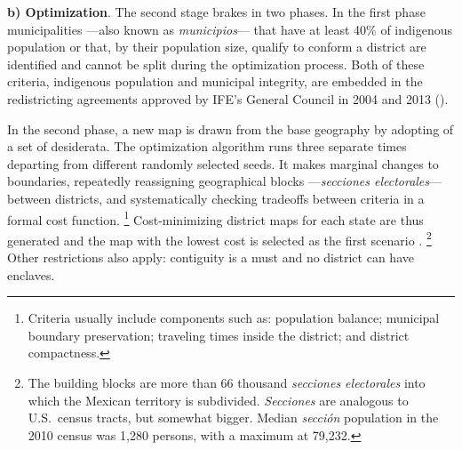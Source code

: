 \documentclass[letter,12pt]{article}
\begin{document}
\textbf{b) Optimization}. The second stage brakes in two phases. In the first phase municipalities ---also known as \emph{municipios}---  that have at least 40\% of indigenous population or that, by their population size, qualify to conform a district are identified and cannot be split during the optimization process. Both of these criteria, indigenous population and municipal integrity, are embedded in the redistricting agreements approved by IFE's General Council in 2004 and 2013 (\citep{acuerdo.ife.2004,acuerdo.ife.2013}). 


In the second phase, a new map is drawn from the base geography by adopting of a set of desiderata. The optimization algorithm runs three separate times departing from different randomly selected seeds. It makes marginal changes to boundaries, repeatedly reassigning geographical blocks ---\emph{secciones electorales}--- between districts, and systematically checking tradeoffs between criteria in a formal cost function. \footnote{Criteria usually include components such as: population balance; municipal boundary preservation; traveling times inside the district; and district compactness.} Cost-minimizing district maps for each state are thus generated and the map with the lowest cost is selected as the first scenario \citep{trelles.mtz.tesisItam.2007}. \footnote{The building blocks are more than 66 thousand \emph{secciones electorales} into which the Mexican territory is subdivided. \emph{Secciones} are analogous to U.S.\ census tracts, but somewhat bigger. Median \emph{secci\'on} population in the 2010 census was 1,280 persons, with a maximum at 79,232.} Other restrictions also apply: contiguity is a must and no district can have enclaves.  
\end{document}
